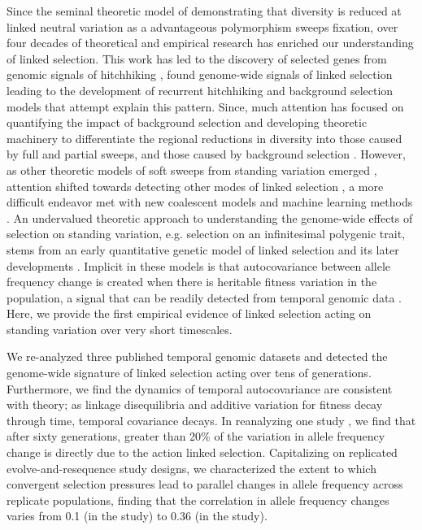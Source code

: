 \documentclass[11pt]{article}
\begin{document}
Since the seminal theoretic model of \textcite{Maynard_Smith1974-lc}
demonstrating that diversity is reduced at linked neutral variation as a
advantageous polymorphism sweeps fixation, over four decades of theoretical and
empirical research has enriched our understanding of linked selection. This
work has led to the discovery of selected genes from genomic signals of
hitchhiking \parencite{Nair2003-tw,Voight2006-rn}, found genome-wide signals of
linked selection
\parencite{Aguade1989-jx,Begun1992-ey,Cutter2010-gi,Andersen2012-bj,Cutter2003-tl}
leading to the development of recurrent hitchhiking \parencite{Stephan1992-jc}
and background selection \parencite{Charlesworth1993-gb} models that attempt
explain this pattern. Since, much attention has focused on quantifying the
impact of background selection \parencite{McVicker2009-ax} and developing
theoretic machinery \parencite{Coop2012-cd} to differentiate the regional
reductions in diversity into those caused by full and partial sweeps, and those
caused by background selection \parencite{Elyashiv2016-vt}. However, as other
theoretic models of soft sweeps from standing variation emerged
\parencite{Hermisson2005-hs,Pennings2006-lj}, attention shifted towards
detecting other modes of linked selection \parencite{Pritchard2010-tk}, a more
difficult endeavor \parencite{Przeworski2005-bg} met with new coalescent models
\parencite{Berg2015-xj} and machine learning methods
\parencite{Schrider2017-yx}. An undervalued theoretic approach to understanding
the genome-wide effects of selection on standing variation, e.g. selection on
an infinitesimal polygenic trait, stems from an early quantitative genetic
model of linked selection \parencite{Robertson1961-ho} and its later
developments \parencite{Santiago1995-hx,Santiago1998-bs}. Implicit in these
models is that autocovariance between allele frequency change is created when
there is heritable fitness variation in the population, a signal that can be
readily detected from temporal genomic data \parencite{Buffalo2019-io}. Here,
we provide the first empirical evidence of linked selection acting on standing
variation over very short timescales.

We re-analyzed three published temporal genomic datasets and detected the
genome-wide signature of linked selection acting over tens of generations.
Furthermore, we find the dynamics of temporal autocovariance are consistent
with theory; as linkage disequilibria and additive variation for fitness decay
through time, temporal covariance decays. In reanalyzing one study
\parencite{Barghi2019-qy}, we find that after sixty generations, greater than
20\% of the variation in allele frequency change is directly due to the action
linked selection. Capitalizing on replicated evolve-and-resequence study
designs, we characterized the extent to which convergent selection pressures
lead to parallel changes in allele frequency across replicate populations,
finding that the correlation in allele frequency changes varies from 0.1 (in
the \cite{Barghi2019-qy} study) to 0.36 (in the \cite{Kelly2019-dc} study).
\end{document}
